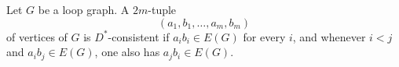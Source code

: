 \begin{definition}
Let \(G\) be a loop graph.  A \(2m\)-tuple
\[
  (a_1,b_1,\ldots,a_m,b_m)
\]
of vertices of \(G\) is \(D^*\)-consistent if \(a_i b_i\in E(G)\) for every
\(i\), and whenever \(i<j\) and \(a_i b_j\in E(G)\), one also has
\(a_j b_i\in E(G)\).
\end{definition}
